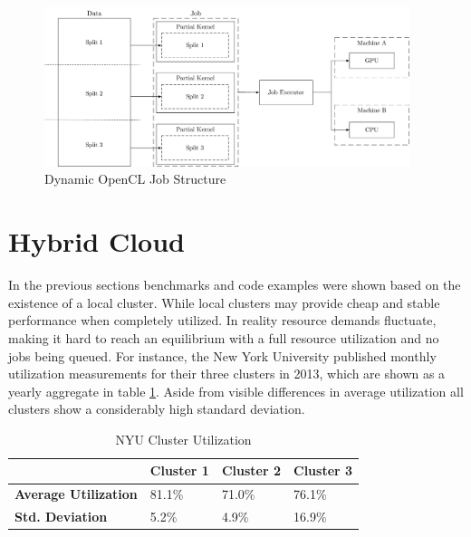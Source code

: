 \begin{figure}[H]
	\includegraphics[width=0.95\textwidth]{drawings/dynamic_opencl_job.pdf}
	\centering
	\caption{Dynamic OpenCL Job Structure}
	\label{img:dynamic_opencl_job}
\end{figure}


\section{Hybrid Cloud}

In the previous sections benchmarks and code examples were shown based on the existence of a local cluster.
While local clusters may provide cheap and stable performance when completely utilized. In reality resource demands fluctuate, making it hard to reach an equilibrium with a full resource utilization and no jobs being queued. For instance, the New York University published monthly utilization measurements for their three clusters in 2013\cite{nyu}, which are shown as a yearly aggregate in table \ref{table:cluster_utilization}. Aside from visible differences in average utilization all clusters show a considerably high standard deviation.

\begin{table}[!htb]
	\centering
	\begin{adjustbox}{width=0.5\textwidth}
		\small
		\begin{tabular}{l | l | l | l}
			~						& \textbf{Cluster 1}	& \textbf{Cluster 2}	& \textbf{Cluster 3}                 \\
			\hline
			\textbf{Average Utilization} 	& 81.1\%  	& 71.0\% 	& 76.1\% \\
			\textbf{Std. Deviation}          & 5.2\%  	& 4.9\%		& 16.9\% \\
		\end{tabular}
	\end{adjustbox}
	
	\caption{NYU Cluster Utilization}
	\label{table:cluster_utilization}
\end{table}


